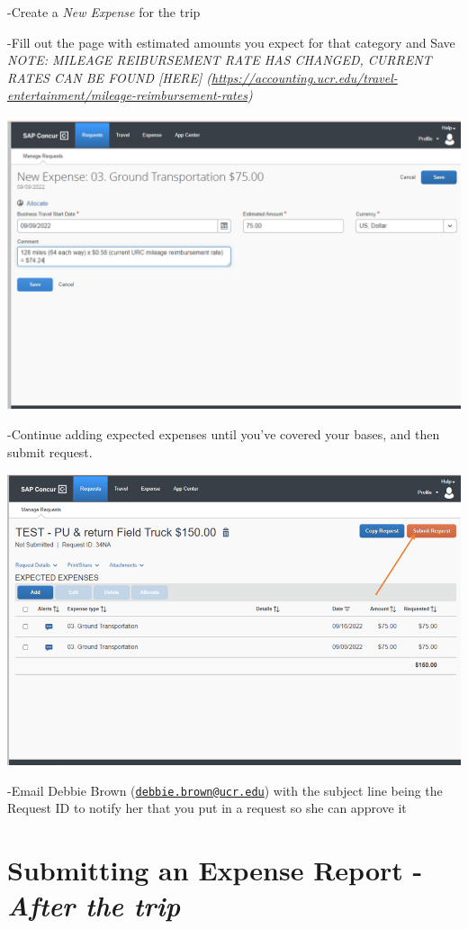 \documentclass[
]{book}
\begin{document}
-Create a \emph{New Expense} for the trip

-Fill out the page with estimated amounts you expect for that category and Save
\emph{NOTE: MILEAGE REIBURSEMENT RATE HAS CHANGED, CURRENT RATES CAN BE FOUND {[}HERE{]} (\url{https://accounting.ucr.edu/travel-entertainment/mileage-reimbursement-rates})}

\begin{flushleft}\includegraphics[width=0.75\linewidth]{images/concur5} \end{flushleft}

-Continue adding expected expenses until you've covered your bases, and then submit request.

\begin{flushleft}\includegraphics[width=0.75\linewidth]{images/concur6} \end{flushleft}

-Email Debbie Brown (\href{mailto:debbie.brown@ucr.edu}{\nolinkurl{debbie.brown@ucr.edu}}) with the subject line being the Request ID to notify her that you put in a request so she can approve it

\hypertarget{submitting-an-expense-report---after-the-trip}{%
\section{\texorpdfstring{Submitting an Expense Report - \emph{After the trip}}{Submitting an Expense Report - After the trip}}\label{submitting-an-expense-report---after-the-trip}}
\end{document}
